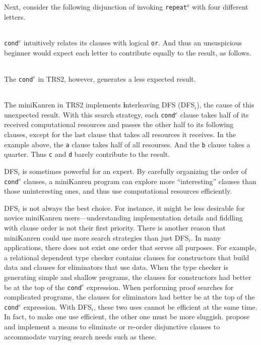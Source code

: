 \documentclass[acmlarge]{acmart}
\newcommand{\conde}{\texttt{cond$^e$}}
\newcommand{\clisting}[1]{
\begin{center}
  \begin{tabular}{c}
	
    \end{tabular}
\end{center}
}
\newcommand{\repeato}{\texttt{repeat$^o$}}
\newcommand{\DFSi }[0]{DFS$_{i}$}
\begin{document}
\clisting{Figures/repeato.rkt}

\noindent Next, consider the following disjunction of invoking \repeato{} with 
four different letters.

\clisting{Figures/example.rkt}

\noindent \conde{} intuitively relates its clauses with logical \texttt{or}. And 
thus an 
unsuspicious beginner would expect each letter to contribute equally to the 
result, as follows.

\clisting{Figures/run-repeato-fair.rkt}

\noindent The \conde{} in TRS2, however, generates a less expected result.

\clisting{Figures/run-repeato-idfs.rkt}

The miniKanren in TRS2 implements \textbf{i}nterleaving DFS (\DFSi), the cause of this 
unexpected result. With this search strategy, each \conde{} clause takes half 
of its received computational resources and passes the other half to its 
following clauses, except for the last clause that takes all resources it 
receives. In the example above, the \texttt{a} clause takes half of all 
resourses. And the \texttt{b} clause takes a quarter. Thus \texttt{c} and 
\texttt{d} barely contribute to the result.

\DFSi{} is sometimes powerful for an expert. By carefully organizing the order 
of \conde{} clauses, a miniKanren program can explore more ``interesting'' 
clauses than those uninteresting ones, and thus use computational resources 
efficiently.

\DFSi{} is not always the best choice. For instance, it might be less 
desirable for novice miniKanren users---understanding implementation details 
and fiddling with clause order is not their first priority. 
There is another reason that miniKanren could use more search strategies than
just \DFSi. In many applications, there does not exist one order that serves all
purposes. For example, a relational dependent type checker contains
clauses for constructors that build data and clauses for eliminators that use
data. When the type checker is generating simple and shallow programs,
the clauses for constructors had better be at the top of the
\conde{} expression.
When performing proof searches for complicated programs, the clauses for 
eliminators had better be at the top of the \conde{} expression. With \DFSi, 
these two uses cannot be efficient at the same time. In fact, to make one use 
efficient, the other one must be more sluggish. \citet{boskin} propose and 
implement a means to eliminate or re-order disjunctive clauses to accommodate 
varying search needs such as these.
\end{document}
